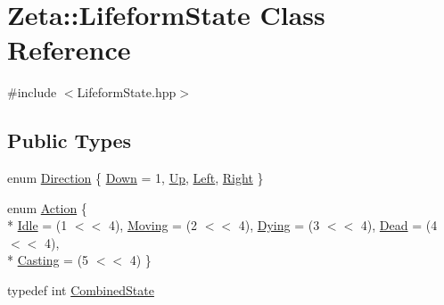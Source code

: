 \hypertarget{classZeta_1_1LifeformState}{\section{Zeta\+:\+:Lifeform\+State Class Reference}
\label{classZeta_1_1LifeformState}
}


{\ttfamily \#include $<$Lifeform\+State.\+hpp$>$}

\subsection*{Public Types}
\begin{DoxyCompactItemize}
\item 
enum \hyperlink{classZeta_1_1LifeformState_a63f770b2fa2c1d9b86b59108888d2806}{Direction} \{ \hyperlink{classZeta_1_1LifeformState_a63f770b2fa2c1d9b86b59108888d2806a29a5961497126fb4f6461866d5729b85}{Down} = 1, 
\hyperlink{classZeta_1_1LifeformState_a63f770b2fa2c1d9b86b59108888d2806a57307df8aa928d6f8c41590fde9ed200}{Up}, 
\hyperlink{classZeta_1_1LifeformState_a63f770b2fa2c1d9b86b59108888d2806aa68660fe7c8c1290263f4730ef614b05}{Left}, 
\hyperlink{classZeta_1_1LifeformState_a63f770b2fa2c1d9b86b59108888d2806ab000dd815e34d2ef6ce88493b1a1f5eb}{Right}
 \}
\item 
enum \hyperlink{classZeta_1_1LifeformState_a965add1b0f9a548c9f3f9147b34b4816}{Action} \{ \\*
\hyperlink{classZeta_1_1LifeformState_a965add1b0f9a548c9f3f9147b34b4816ad01637e23e43aad62b74fae8f549e596}{Idle} = (1 $<$$<$ 4), 
\hyperlink{classZeta_1_1LifeformState_a965add1b0f9a548c9f3f9147b34b4816a52953f7bff45d440cd6397305b714e7d}{Moving} = (2 $<$$<$ 4), 
\hyperlink{classZeta_1_1LifeformState_a965add1b0f9a548c9f3f9147b34b4816a141e153e6f7481678ab57e7f408edb03}{Dying} = (3 $<$$<$ 4), 
\hyperlink{classZeta_1_1LifeformState_a965add1b0f9a548c9f3f9147b34b4816af1c88975cad85dc039c4e2bff23c9dee}{Dead} = (4 $<$$<$ 4), 
\\*
\hyperlink{classZeta_1_1LifeformState_a965add1b0f9a548c9f3f9147b34b4816a817d466cbf3364cadb5310208800701c}{Casting} = (5 $<$$<$ 4)
 \}
\item 
typedef int \hyperlink{classZeta_1_1LifeformState_a877fbe4e8efefd0a5323f950909181b6}{Combined\+State}
\end{DoxyCompactItemize}
